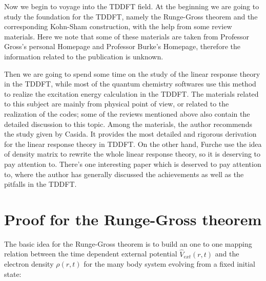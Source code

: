 Now we begin to voyage into the TDDFT field. At the beginning we are
going to study the foundation for the TDDFT, namely the Runge-Gross
theorem and the corresponding Kohn-Sham construction, with the help
from some review materials\cite{Gross1, Gross3, Leeuwen,
Gordon,Gross7}. Here we note that some of these materials are taken
from Professor Gross's personal Homepage\cite{Gross4}
and Professor Burke's Homepage\cite{Burke}, therefore the
information related to the publication is unknown.

Then we are going to spend some time on the study of the linear
response theory in the TDDFT, while most of the quantum chemistry
softwares use this method to realize the excitation energy
calculation in the TDDFT. The materials related to this subject are
mainly from physical point of view\cite{Grabo2000353,
PhysRevLett.76.1212, gorling:2785, furche:5982, jamorski:5134}, or
related to the realization of the codes\cite{stratmann:8218,
Bauernschmitt1996454, Bauernschmitt1997573}; some of the reviews
mentioned above also contain the detailed discussion to this
topic\cite{Gross1, Gross3, Gordon, Gross7, Gross8}. Among
the materials, the author recommends the study given by
Casida\cite{Casida1}. It provides the most detailed and rigorous
derivation for the linear response theory in TDDFT. On the other
hand, Furche\cite{furche:5982} use the idea of density matrix to
rewrite the whole linear response theory, so it is deserving to pay
attention to. There's one interesting paper which is deserved to pay
attention to, where the author has generally discussed the
achievements as well as the pitfalls in the
TDDFT\cite{burke:062206}.

\section{Proof for the Runge-Gross theorem}\label{TDDFT:4}
%
%
%
%
The basic idea for the Runge-Gross theorem\cite{Gross2} is to build
an one to one mapping relation between the time dependent external
potential $\hat{V}_{ext}(r,t)$ and the electron density $\rho(r,t)$
for the many body system evolving from a fixed initial state:


